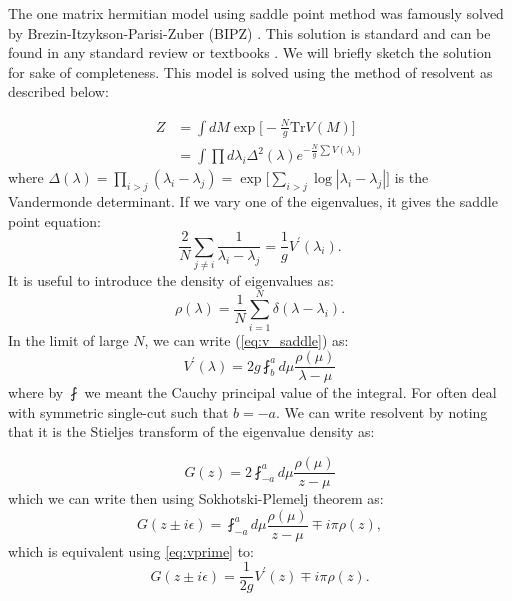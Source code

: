 \documentclass[11pt]{article}
\begin{document}
The one matrix hermitian model using saddle point method was famously solved by Brezin-Itzykson-Parisi-Zuber (BIPZ) \cite{Brezin:1977sv}. This solution is standard and can be found in any standard review or textbooks \cite{DiFrancesco:1993cyw, Marino:2004eq}. We will briefly sketch the solution for sake of completeness. This model is solved using the method of resolvent as described below:




\begin{align}
	Z &= \int dM \exp\Big[-\frac{N}{g} \mbox{Tr} V(M)\Big] \\
	& = \int \prod d\lambda_{i} \Delta^2(\lambda)  e^{-\frac{N}{g} \sum V(\lambda_i)} 
\end{align}
where $\Delta(\lambda) = \prod_{i > j} (\lambda_i - \lambda_j) = \exp\Big[\sum_{i>j} \log |\lambda_{i} - \lambda_{j}|\Big]$ is the Vandermonde 
determinant. If we vary one of the eigenvalues, it gives the saddle point equation:
\begin{equation}
	\label{eq:v_saddle}
	\frac{2}{N} \sum_{j \neq i} \frac{1}{\lambda_i - \lambda_j} = \frac{1}{g} V^{\prime}(\lambda_i).
\end{equation}
It is useful to introduce the density of eigenvalues as:
\begin{equation}
	\rho(\lambda) = \frac{1}{N} \sum_{i=1}^{N} \delta(\lambda - \lambda_i). 
\end{equation}
In the limit of large $N$, we can write (\ref{eq:v_saddle})
as:
\begin{equation}
	\label{eq:vprime}
	V^{\prime}(\lambda) = 2g \fint_{b}^{a} d\mu \frac{\rho(\mu)}{\lambda - \mu} 
\end{equation}
where by $\fint$ we meant the Cauchy principal value of the integral. For often deal with symmetric single-cut such that $b=-a$. We can write resolvent by noting that it is the Stieljes transform of the eigenvalue density as: 

\begin{equation}
	G(z) = 2 \fint_{-a}^{a} d\mu \frac{\rho(\mu)}{z - \mu}
\end{equation}
which we can write then using Sokhotski-Plemelj theorem as:
\begin{equation}
	G(z \pm i \epsilon) = \fint_{-a}^{a} d\mu \frac{\rho(\mu)}{z - \mu} \mp i\pi \rho(z),  
\end{equation}
which is equivalent using \ref{eq:vprime} to: 
\begin{equation}
	G(z \pm i \epsilon) = \frac{1}{2g} V^{\prime}(z) \mp i\pi \rho(z).  
\end{equation}
\end{document}
